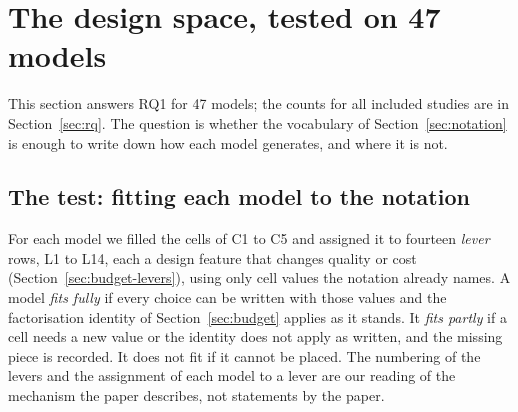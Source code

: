 \section{The design space, tested on 47 models}
\label{sec:design}

This section answers RQ1 for 47 models; the counts for all included studies are in Section~\ref{sec:rq}. The question is whether the vocabulary of Section~\ref{sec:notation} is enough to write down how each model generates, and where it is not.

\subsection{The test: fitting each model to the notation}
\label{sec:design-test}

For each model we filled the cells of C1 to C5 and assigned it to fourteen \emph{lever} rows, L1 to L14, each a design feature that changes quality or cost (Section~\ref{sec:budget-levers}), using only cell values the notation already names. A model \emph{fits fully} if every choice can be written with those values and the factorisation identity of Section~\ref{sec:budget} applies as it stands. It \emph{fits partly} if a cell needs a new value or the identity does not apply as written, and the missing piece is recorded. It does not fit if it cannot be placed. %
The numbering of the levers and the assignment of each model to a lever are our reading of the mechanism the paper describes, not statements by the paper. %

